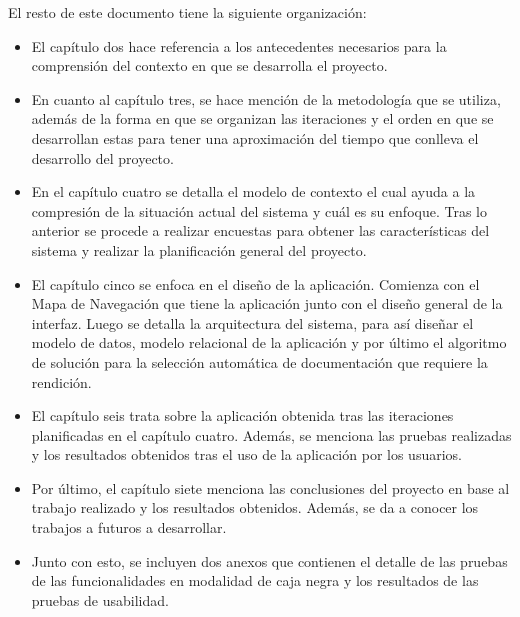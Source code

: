 El resto de este documento tiene la siguiente organización:

\begin{itemize}
    \item El capítulo dos hace referencia a los antecedentes necesarios para la comprensión del contexto en que se desarrolla el proyecto.
    \item En cuanto al capítulo tres, se hace mención de la metodología que se utiliza, además de la forma en que se organizan las iteraciones y el orden en que se desarrollan estas para tener una aproximación del tiempo que conlleva el desarrollo del proyecto.
    \item En el capítulo cuatro se detalla el modelo de contexto el cual ayuda a la compresión de la situación actual del sistema y cuál es su enfoque. Tras lo anterior se procede a realizar encuestas para obtener las características del sistema y realizar la planificación general del proyecto.
    \item El capítulo cinco se enfoca en el diseño de la aplicación. Comienza con el Mapa de Navegación que tiene la aplicación junto con el diseño general de la interfaz. Luego se detalla la arquitectura del sistema, para así diseñar el modelo de datos, modelo relacional de la aplicación y por último el algoritmo de solución para la selección automática de documentación que requiere la rendición.
    \item El capítulo seis trata sobre la aplicación obtenida tras las iteraciones planificadas en el capítulo cuatro. Además, se menciona las pruebas realizadas y los resultados obtenidos tras el uso de la aplicación por los usuarios.
    \item Por último, el capítulo siete menciona las conclusiones del proyecto en base al trabajo realizado y los resultados obtenidos. Además, se da a conocer los trabajos a futuros a desarrollar.
    \item Junto con esto, se incluyen dos anexos que contienen el detalle de las pruebas de las funcionalidades en modalidad de caja negra y los resultados de las pruebas de usabilidad.
\end{itemize}
